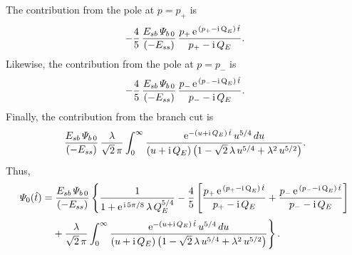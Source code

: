 \documentclass[titlepage=false,12pt]{article}
\begin{document}
The contribution from the pole at $p=p_+$ is 
\begin{equation}
-\frac{4}{5}\,\frac{E_{sb}\,{\mit\Psi}_{b\,0}}{(-E_{ss})}\,\frac{p_+\,{\rm e}^{\,(p_+-{\rm i\,Q}_E)\,\hat{t}}}{p_+-{\rm i}\,Q_E}.
\end{equation}
Likewise, the contribution from the pole at $p=p_-$ is 
\begin{equation}
-\frac{4}{5}\,\frac{E_{sb}\,{\mit\Psi}_{b\,0}}{(-E_{ss})}\,\frac{p_-\,{\rm e}^{\,(p_--{\rm i\,Q}_E)\,\hat{t}}}{p_--{\rm i}\,Q_E}.
\end{equation}
Finally, the contribution from the branch cut is 
\begin{equation}
\frac{E_{sb}\,{\mit\Psi}_{b\,0}}{(-E_{ss})}\,\frac{\lambda}{\sqrt{2}\,\pi}\int_0^\infty
\frac{{\rm e}^{-(u+{\rm i}\,Q_E)\,\hat{t}}\,u^{5/4}\,du}{(u+{\rm i}\,Q_E)\left(1-\sqrt{2}\,\lambda\,u^{5/4}+\lambda^2\,u^{5/2}\right)}.
\end{equation}
Thus,
\begin{align}
{\mit\Psi}_0(\hat{t}) &=\frac{E_{sb}\,{\mit\Psi}_{b\,0}}{(-E_{ss})}\left\{\frac{1}{1+{\rm e}^{\,{\rm i}\,5\pi/8}\,\lambda\,Q_E^{5/4}}
-\frac{4}{5}\left[\frac{p_+\,{\rm e}^{\,(p_+-{\rm i\,Q}_E)\,\hat{t}}}{p_+-{\rm i}\,Q_E}+\frac{p_-\,{\rm e}^{\,(p_--{\rm i\,Q}_E)\,\hat{t}}}{p_--{\rm i}\,Q_E}\right]\right.\nonumber\\[0.5ex]
&\left.\phantom{=}+\frac{\lambda}{\sqrt{2}\,\pi}\int_0^\infty
\frac{{\rm e}^{-(u+{\rm i}\,Q_E)\,\hat{t}}\,u^{5/4}\,du}{(u+{\rm i}\,Q_E)\left(1-\sqrt{2}\,\lambda\,u^{5/4}+\lambda^2\,u^{5/2}\right)}\right\}.
\end{align}
\end{document}
